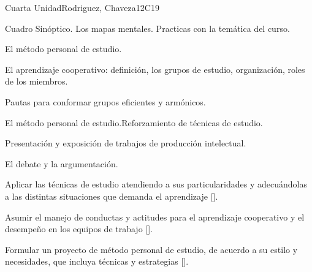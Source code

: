 \begin{syllabus}
\begin{unit}{}{Cuarta Unidad}{Rodriguez, Chaveza}{12}{C19}
\begin{topics}
        \item Cuadro Sinóptico. Los mapas mentales. Practicas con la temática del curso.
        \item El método personal de estudio.
        \item El aprendizaje cooperativo: definición, los grupos de estudio, organización, roles de los miembros.
        \item Pautas para conformar grupos eficientes y armónicos.
        \item El método personal de estudio.Reforzamiento de técnicas de estudio.
        \item Presentación y exposición de trabajos de producción intelectual.
        \item El debate y la argumentación.
\end{topics}
\begin{learningoutcomes}
        \item Aplicar las técnicas de estudio atendiendo a sus particularidades y adecuándolas a las distintas situaciones que demanda el aprendizaje [\Usage].
        \item Asumir el manejo de conductas y actitudes para el aprendizaje cooperativo y el desempeño en los equipos de trabajo [\Usage].
        \item Formular un proyecto de método personal de estudio, de acuerdo a su estilo y necesidades, que incluya técnicas y estrategias [\Usage].
\end{learningoutcomes}
\end{unit}



\begin{coursebibliography}
\end{coursebibliography}

\end{syllabus}
